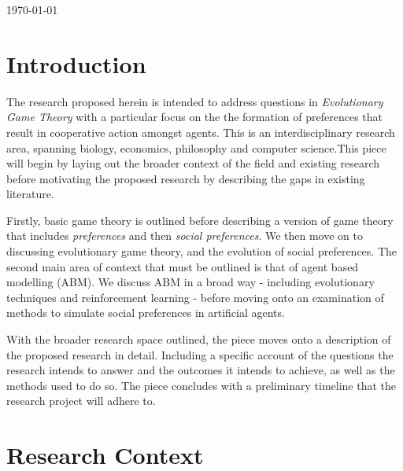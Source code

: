 \documentclass[12pt]{article}
\newcommand*{\np}{\par\noindent\newline}
\begin{document}
\begin{titlepage}
	\vfill\vfill\vfill %
	
	{\large\today} %
	
	
	 
	
	\vfill %
	
\end{titlepage}
\section{Introduction}
The research proposed herein is intended to address questions in
\textit{Evolutionary Game Theory} with a particular focus on the the formation
of preferences that result in cooperative action amongst agents. This is an
interdisciplinary research area, spanning biology, economics, philosophy and
computer science.This piece will begin by laying out the broader context of the
field and existing research before motivating the proposed research by
describing the gaps in existing literature.
\np Firstly, basic game theory is outlined before describing a version of
game theory that includes \textit{preferences} and then \textit{social
preferences}. We then move on to discussing evolutionary game theory, and the
evolution of social preferences. The second main area of context that must be
outlined is that of agent based modelling (ABM). We discuss ABM in a broad way
- including evolutionary techniques and reinforcement learning - before moving
onto an examination of methods to simulate social preferences in artificial
agents.
\np With the broader research space outlined, the piece moves onto a
description of the proposed research in detail. Including a specific account of
the questions the research intends to answer and the outcomes it intends to
achieve, as well as the methods used to do so. The piece concludes with a
preliminary timeline that the research project will adhere to. 
\section{Research Context}
\end{document}
